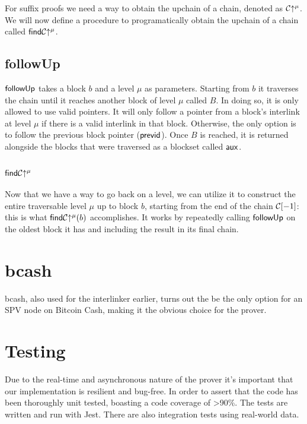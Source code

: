For suffix proofs we need a way to obtain the upchain of a chain, denoted as $\mathcal{C}\negthickspace\uparrow^\mu$. We will now define a procedure to programatically obtain the upchain of a chain called $\sf find \mathcal{C}\negthickspace\uparrow^\mu$.

\subsection{\sf followUp}
$\sf followUp$ takes a block $b$ and a level $\mu$ as parameters. Starting from $b$ it traverses the chain until it reaches another block of level $\mu$ called $B$. In doing so, it is only allowed to use valid pointers. It will only follow a pointer from a block's interlink at level $\mu$ if there is a valid interlink in that block. Otherwise, the only option is to follow the previous block pointer ($\sf previd$). Once $B$ is reached, it is returned alongside the blocks that were traversed as a blockset called $\sf aux$.




\subsection{$\sf find \mathcal{C}\negthickspace\uparrow^\mu$}
Now that we have a way to go back on a level, we can utilize it to construct the entire traversable level $\mu$ up to block $b$, starting from the end of the chain $\mathcal{C}[-1]$: this is what ${\sf find \mathcal{C}\negthickspace\uparrow^\mu}(b)$ accomplishes. It works by repeatedly calling $\sf followUp$ on the oldest block it has and including the result in its final chain.



\section{bcash}
bcash, also used for the interlinker earlier, turns out the be the only option for an SPV node on Bitcoin Cash, making it the obvious choice for the prover.

\section{Testing}
Due to the real-time and asynchronous nature of the prover it's important that our implementation is resilient and bug-free. In order to assert that the code has been thoroughly unit tested, boasting a code coverage of >90\%. The tests are written and run with Jest. There are also integration tests using real-world data.
